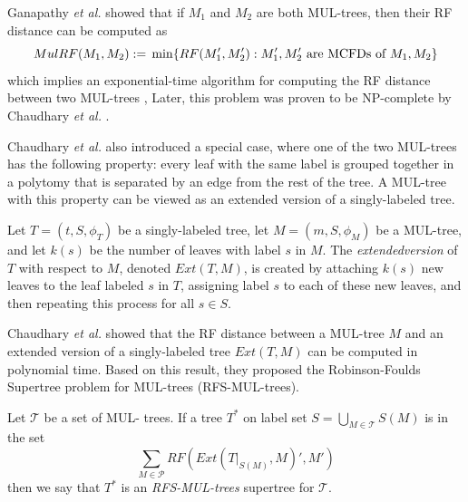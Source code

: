 Ganapathy {\em et al.} \cite{ganapathy2006pattern} showed that if $M_1$ and $M_2$ are both MUL-trees, then their RF distance can be computed as 
\begin{equation}
	\label{eq:mulrf}
	MulRF(M_1, M_2) := \\
	\min\{ RF(M_1', M_2') : M_1', M_2' \text{ are MCFDs of } M_1, M_2 \}
\end{equation}
which implies an exponential-time algorithm for computing the RF distance between two MUL-trees \cite{ganapathy2006pattern},
Later, this problem was proven to be NP-complete by Chaudhary {\em et al.} \cite{chaudhary2013inferring}.

Chaudhary {\em et al.} \cite{chaudhary2013inferring} also introduced a special case, where one of the two MUL-trees has the following property: every leaf with the same label is grouped together in a \gls{polytomy} that is separated by an edge from the rest of the tree.
A MUL-tree with this property can be viewed as an extended version of a singly-labeled tree.

\begin{definition}
\label{defn:extd}
Let $T = (t, S, \phi_T)$ be a singly-labeled tree, let $M = (m, S, \phi_M)$ be a MUL-tree, and let $k(s)$ be the number of leaves with label $s$ in $M$.
The \emph{\gls{extendedversion}} of $T$ with respect to $M$, denoted $Ext(T,M)$, is created by attaching $k(s)$ new leaves to the leaf labeled $s$ in $T$, assigning label $s$ to each of these new leaves, and then repeating this process for all $s \in S$.
\end{definition}

Chaudhary {\em et al.} \cite{chaudhary2013inferring} showed that the RF distance between a MUL-tree $M$ and an extended version of a singly-labeled tree $Ext(T,M)$ can be computed in polynomial time.
Based on this result, they proposed the Robinson-Foulds Supertree problem for MUL-trees (RFS-MUL-trees).

\begin{definition}
Let $\mathcal{T}$ be a set of MUL- trees.
If a tree $T^*$ on label set $S = \bigcup_{M \in \mathcal{T}} S(M)$ is in the set
\begin{equation}
    \label{eq:mulrfsp}
    \sum_{M \in \mathcal{P}} RF(Ext(T|_{S(M)}, M)', M')
\end{equation}
then we say that $T^*$ is an \emph{\gls{RFS-MUL-trees}} supertree for $\mathcal{T}$.
\end{definition}

